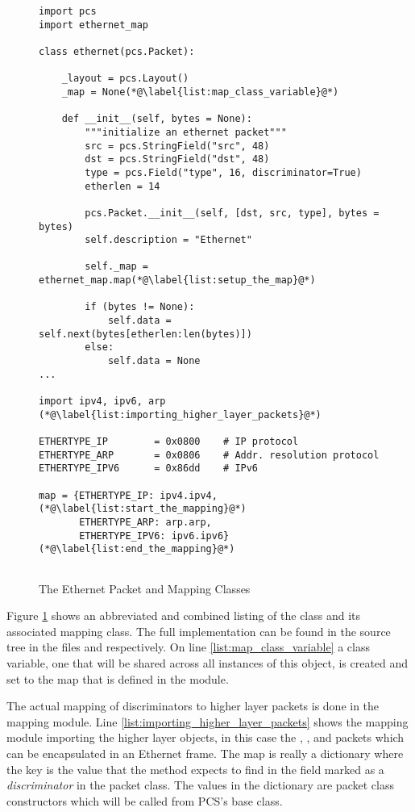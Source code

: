 \documentclass[11pt]{article}
\begin{document}
\begin{figure}
  \begin{lstlisting}
import pcs
import ethernet_map

class ethernet(pcs.Packet):

    _layout = pcs.Layout()
    _map = None(*@\label{list:map_class_variable}@*)
    
    def __init__(self, bytes = None):
        """initialize an ethernet packet"""
        src = pcs.StringField("src", 48)
        dst = pcs.StringField("dst", 48)
        type = pcs.Field("type", 16, discriminator=True)
        etherlen = 14

        pcs.Packet.__init__(self, [dst, src, type], bytes = bytes)
        self.description = "Ethernet"

        self._map = ethernet_map.map(*@\label{list:setup_the_map}@*)

        if (bytes != None):
            self.data = self.next(bytes[etherlen:len(bytes)])
        else:
            self.data = None
...

import ipv4, ipv6, arp (*@\label{list:importing_higher_layer_packets}@*)

ETHERTYPE_IP		= 0x0800	# IP protocol 
ETHERTYPE_ARP		= 0x0806	# Addr. resolution protocol
ETHERTYPE_IPV6		= 0x86dd	# IPv6

map = {ETHERTYPE_IP: ipv4.ipv4,(*@\label{list:start_the_mapping}@*)
       ETHERTYPE_ARP: arp.arp,
       ETHERTYPE_IPV6: ipv6.ipv6}(*@\label{list:end_the_mapping}@*)
    
  \end{lstlisting}
  \caption{The Ethernet Packet and Mapping Classes}
  \label{fig:ethernet_packet_and_mapping_classes}
\end{figure}

Figure \ref{fig:ethernet_packet_and_mapping_classes} shows an
abbreviated and combined listing of the  class and its
associated mapping class.  The full implementation can be found in the 
source tree in the files  and
 respectively.  On line
\ref{list:map_class_variable} a class variable, one that will be
shared across all instances of this object, is created and set to the
map that is defined in the  module.

The actual mapping of discriminators to higher layer packets is done
in the mapping module.  Line \ref{list:importing_higher_layer_packets}
shows the mapping module importing the higher layer objects, in this
case the , , and  packets which can
be encapsulated in an Ethernet frame.  The map is really a
 dictionary where the key is the value that the
 method expects to find in the field marked as a
\emph{discriminator} in the  packet class.  The values
in the dictionary are packet class constructors which will be called
from PCS's  base class.
\end{document}
